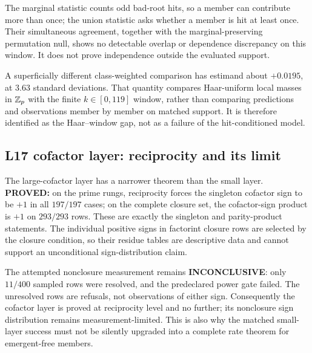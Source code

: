 The marginal statistic counts odd bad-root hits, so a member can
contribute more than once; the union statistic asks whether a member is
hit at least once.  Their simultaneous agreement, together with the
marginal-preserving permutation null, shows no detectable overlap or
dependence discrepancy on this window.  It does not prove independence
outside the evaluated support.

A superficially different class-weighted comparison has estimand about
$+0.0195$, at $3.63$ standard deviations.
That quantity compares Haar-uniform local masses in $\mathbb{Z}_p$ with the
finite $k\in[0,119]$ window, rather than comparing predictions and
observations member by member on matched support.
It is therefore identified as the Haar--window gap, not as a failure of
the hit-conditioned model.

\subsection{L17 cofactor layer: reciprocity and its limit}

The large-cofactor layer has a narrower theorem than the small layer.
\textbf{PROVED:} on the prime rungs, reciprocity forces the singleton
cofactor sign to be $+1$ in all $197/197$ cases; on the complete closure
set, the cofactor-sign product is $+1$ on $293/293$ rows.
These are exactly the singleton and parity-product statements.  The
individual positive signs in factorint closure rows are selected by the
closure condition, so their residue tables are descriptive data and
cannot support an unconditional sign-distribution claim.

The attempted nonclosure measurement remains \textbf{INCONCLUSIVE}:
only $11/400$ sampled rows were resolved, and the predeclared power gate
failed.
The unresolved rows are refusals, not observations of either sign.
Consequently the cofactor layer is proved at reciprocity level and no
further; its nonclosure sign distribution remains measurement-limited.
This is also why the matched small-layer success must not be silently
upgraded into a complete rate theorem for emergent-free members.
